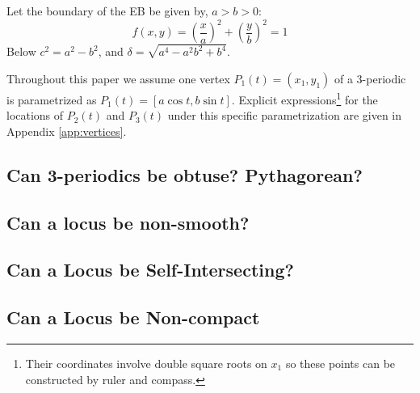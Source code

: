 Let the boundary of the EB be given by, $a>b>0$:
%
\begin{equation}
f(x,y)=\left(\frac{x}{a}\right)^2+\left(\frac{y}{b}\right)^2=1
\label{eqn:billiard-f}
\end{equation}
%
\noindent Below $c^2=a^2-b^2$, and $\delta=\sqrt{a^4-a^2 b^2+b^4}$.

Throughout this paper we assume one vertex $P_1(t)=(x_1,y_1)$ of a 3-periodic is parametrized as $P_1(t)=[a\cos{t},b\sin{t}]$. Explicit expressions\footnote{Their coordinates involve double square roots on $x_1$ so these points can be constructed by ruler and compass.} for the locations of $P_2(t)$ and $P_3(t)$ under this specific parametrization are given in
Appendix \ref{app:vertices}.

\subsection{Can 3-periodics be obtuse? Pythagorean?}
\label{sec:x4}


\subsection{Can a locus be non-smooth?}
\label{sec:orthic-incenter}


\subsection{Can a Locus be Self-Intersecting?}
\label{sec:x59}


\subsection{Can a Locus be Non-compact}
\label{sec:x26}
